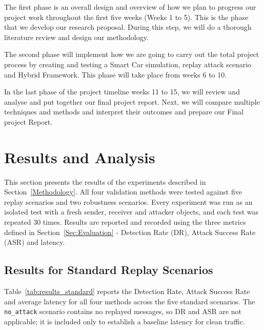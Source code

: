 \documentclass[a4paper,man,12pt]{article}
\begin{document}
The first phase is an overall design and overview of how we plan to progress our project work throughout the first five weeks (Weeks 1 to 5). This is the phase that we develop our research proposal. During this step, we will do a thorough literature review and design our methodology.\bigbreak

The second phase will implement how we are going to carry out the total project process by creating and testing a Smart Car simulation, replay attack scenario and Hybrid Framework. This phase will take place from weeks 6 to 10.\bigbreak

In the last phase of the project timeline weeks 11 to 15, we will review and analyse and put together our final project report. Next, we will compare multiple techniques and methods and interpret their outcomes and prepare our Final project Report. 

\pagebreak

\section{Results and Analysis}

This section presents the results of the experiments described in
Section~\ref{Methodology}. All four validation methods were tested against five
replay scenarios and two robustness scenarios. Every experiment was run as
an isolated test with a fresh sender, receiver and attacker objects, and each test
was repeated 30 times. Results are reported and recorded using the three metrics defined in
Section~\ref{Sec:Evaluation} - Detection Rate (DR), Attack Success Rate (ASR) and latency.

\subsection{Results for Standard Replay Scenarios}

Table~\ref{tab:results_standard} reports the Detection Rate, Attack Success Rate
and average latency for all four methods across the five standard scenarios. The
\texttt{no\_attack} scenario contains no replayed messages, so DR and ASR are
not applicable; it is included only to establish a baseline latency for clean
traffic.
\end{document}
